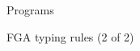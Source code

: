 \begin{figure}
\begin{mathpar}
    \end{mathpar}

    Programs \hfill {}
    \begin{mathpar}
    \end{mathpar}

    \caption{FGA typing rules (2 of 2)}
    \label{fig:fg-typing-2}
\end{figure}
